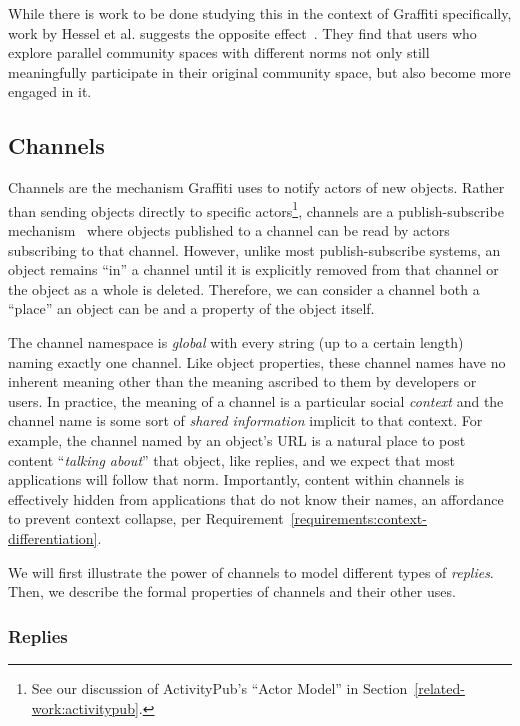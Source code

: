 While there is work to be done studying this in the context of Graffiti specifically,
work by Hessel et al.
suggests the opposite effect~{\cite{highlyrelatedcommunities}}.
They find that users who explore parallel community spaces
with different norms not only still meaningfully participate in their original community space,
but also become more engaged in it.

\subsection{Channels}
\label{concepts:channels}

Channels are the mechanism Graffiti uses to notify
actors of new objects.
Rather than sending objects directly to specific actors\footnote{
    See our discussion of ActivityPub's ``Actor Model'' in Section~\ref{related-work:activitypub}.
},
channels are a publish-subscribe mechanism~\cite{pubsub}
where objects published to a channel
can be read by actors subscribing to that channel.
However, unlike most publish-subscribe systems,
an object remains ``in'' a channel until
it is explicitly removed from that channel
or the object as a whole is deleted.
Therefore, we can consider a channel both a ``place''
an object can be and a property of the object itself.

The channel namespace is \emph{global} with every string (up to a certain length)
naming exactly one channel.
Like object properties, these channel names have no inherent meaning
other than the meaning ascribed to them by developers or users.
In practice, the meaning of a channel is a particular social \emph{context} and the channel
name is some sort of \emph{shared information} implicit to that context.
For example, the channel named by an object's URL is a natural place to post content ``\emph{talking about}'' that object, like replies, and we expect that most applications will follow that norm.
Importantly, content within channels is effectively hidden from applications
that do not know their names,
an affordance to prevent context collapse, per Requirement~\ref{requirements:context-differentiation}.

We will first illustrate the power of channels
to model different types of \emph{replies}.
Then, we describe the formal properties of channels and their other uses.

\subsubsection{Replies}

